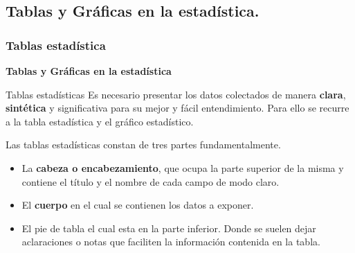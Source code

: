 \documentclass[11pt]{beamer}
\begin{document}
    \subsection*{Tablas y Gráficas en la estadística.}
    \subsubsection*{Tablas estadística}
      \begin{frame}{}
          \centering
          \textbf{ \huge Tablas y Gráficas en la estadística}
      \end{frame}


      \begin{frame}{Tablas estadísticas}
        Es necesario presentar los datos colectados de manera \textbf{clara}, \textbf{sintética} y significativa para su mejor y fácil entendimiento. Para ello se recurre a la tabla estadística y el gráfico estadístico.
        \vspace{0.8cm}

        Las tablas estadísticas constan de tres partes fundamentalmente.
        \begin{itemize}
            \item La \textbf{cabeza o encabezamiento}, que ocupa la parte superior de la misma y contiene el título y el nombre de cada campo de modo claro.
            \item El \textbf{cuerpo} en el cual se contienen los datos a exponer.
            \item El pie de tabla el cual esta en la parte inferior. Donde se suelen dejar aclaraciones o notas que faciliten la información contenida en la tabla.
        \end{itemize}
      \end{frame}
\end{document}
